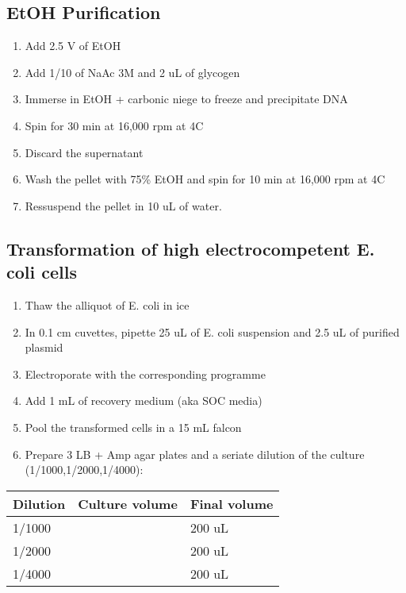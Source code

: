 \documentclass[11pt]{article}
\begin{document}
\subsection{EtOH Purification}
\label{sec:orgd34d048}
\begin{enumerate}
\item Add 2.5 V of EtOH\\
\item Add 1/10 of NaAc 3M and 2 uL of glycogen\\
\item Immerse in EtOH + carbonic niege to freeze and precipitate DNA\\
\item Spin for 30 min at 16,000 rpm at 4C\\
\item Discard the supernatant\\
\item Wash the pellet with 75\% EtOH and spin for 10 min at 16,000 rpm at 4C\\
\item Ressuspend the pellet in 10 uL of water.\\
\end{enumerate}

\subsection{Transformation of high electrocompetent E. coli cells}
\label{sec:orga2c64ae}
\begin{enumerate}
\item Thaw the alliquot of E. coli in ice\\
\item In 0.1 cm cuvettes, pipette 25 uL of E. coli suspension and 2.5 uL of purified plasmid\\
\item Electroporate with the corresponding programme\\
\item Add 1 mL of recovery medium (aka SOC media)\\
\item Pool the transformed cells in a 15 mL falcon\\
\item Prepare 3 LB + Amp agar plates and a seriate dilution of the culture (1/1000,1/2000,1/4000):\\
\end{enumerate}

\begin{center}
\begin{tabular}{lll}
\hline
Dilution & Culture volume & Final volume\\
\hline
1/1000 &  & 200 uL\\
1/2000 &  & 200 uL\\
1/4000 &  & 200 uL\\
\hline
\end{tabular}
\end{center}
\end{document}
